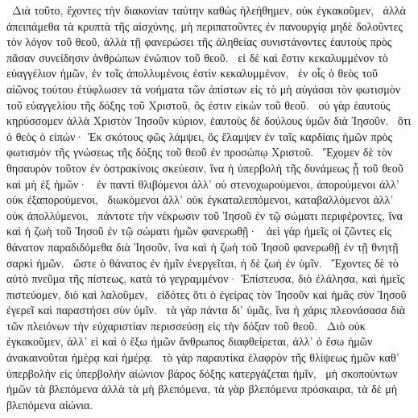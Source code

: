 ~Διὰ τοῦτο, ἔχοντες τὴν διακονίαν ταύτην καθὼς ἠλεήθημεν, οὐκ ἐγκακοῦμεν,
~ἀλλὰ ἀπειπάμεθα τὰ κρυπτὰ τῆς αἰσχύνης, μὴ περιπατοῦντες ἐν πανουργίᾳ μηδὲ δολοῦντες τὸν λόγον τοῦ θεοῦ, ἀλλὰ τῇ φανερώσει τῆς ἀληθείας συνιστάνοντες ἑαυτοὺς πρὸς πᾶσαν συνείδησιν ἀνθρώπων ἐνώπιον τοῦ θεοῦ.
~εἰ δὲ καὶ ἔστιν κεκαλυμμένον τὸ εὐαγγέλιον ἡμῶν, ἐν τοῖς ἀπολλυμένοις ἐστὶν κεκαλυμμένον,
~ἐν οἷς ὁ θεὸς τοῦ αἰῶνος τούτου ἐτύφλωσεν τὰ νοήματα τῶν ἀπίστων εἰς τὸ μὴ αὐγάσαι τὸν φωτισμὸν τοῦ εὐαγγελίου τῆς δόξης τοῦ Χριστοῦ, ὅς ἐστιν εἰκὼν τοῦ θεοῦ.
~οὐ γὰρ ἑαυτοὺς κηρύσσομεν ἀλλὰ Χριστὸν Ἰησοῦν κύριον, ἑαυτοὺς δὲ δούλους ὑμῶν διὰ Ἰησοῦν.
~ὅτι ὁ θεὸς ὁ εἰπών· Ἐκ σκότους φῶς λάμψει, ὃς ἔλαμψεν ἐν ταῖς καρδίαις ἡμῶν πρὸς φωτισμὸν τῆς γνώσεως τῆς δόξης τοῦ θεοῦ ἐν προσώπῳ Χριστοῦ.
~Ἔχομεν δὲ τὸν θησαυρὸν τοῦτον ἐν ὀστρακίνοις σκεύεσιν, ἵνα ἡ ὑπερβολὴ τῆς δυνάμεως ᾖ τοῦ θεοῦ καὶ μὴ ἐξ ἡμῶν·
~ἐν παντὶ θλιβόμενοι ἀλλ’ οὐ στενοχωρούμενοι, ἀπορούμενοι ἀλλ’ οὐκ ἐξαπορούμενοι,
~διωκόμενοι ἀλλ’ οὐκ ἐγκαταλειπόμενοι, καταβαλλόμενοι ἀλλ’ οὐκ ἀπολλύμενοι,
~πάντοτε τὴν νέκρωσιν τοῦ Ἰησοῦ ἐν τῷ σώματι περιφέροντες, ἵνα καὶ ἡ ζωὴ τοῦ Ἰησοῦ ἐν τῷ σώματι ἡμῶν φανερωθῇ·
~ἀεὶ γὰρ ἡμεῖς οἱ ζῶντες εἰς θάνατον παραδιδόμεθα διὰ Ἰησοῦν, ἵνα καὶ ἡ ζωὴ τοῦ Ἰησοῦ φανερωθῇ ἐν τῇ θνητῇ σαρκὶ ἡμῶν.
~ὥστε ὁ θάνατος ἐν ἡμῖν ἐνεργεῖται, ἡ δὲ ζωὴ ἐν ὑμῖν.
~Ἔχοντες δὲ τὸ αὐτὸ πνεῦμα τῆς πίστεως, κατὰ τὸ γεγραμμένον· Ἐπίστευσα, διὸ ἐλάλησα, καὶ ἡμεῖς πιστεύομεν, διὸ καὶ λαλοῦμεν,
~εἰδότες ὅτι ὁ ἐγείρας τὸν Ἰησοῦν καὶ ἡμᾶς σὺν Ἰησοῦ ἐγερεῖ καὶ παραστήσει σὺν ὑμῖν.
~τὰ γὰρ πάντα δι’ ὑμᾶς, ἵνα ἡ χάρις πλεονάσασα διὰ τῶν πλειόνων τὴν εὐχαριστίαν περισσεύσῃ εἰς τὴν δόξαν τοῦ θεοῦ.
~Διὸ οὐκ ἐγκακοῦμεν, ἀλλ’ εἰ καὶ ὁ ἔξω ἡμῶν ἄνθρωπος διαφθείρεται, ἀλλ’ ὁ ἔσω ἡμῶν ἀνακαινοῦται ἡμέρᾳ καὶ ἡμέρᾳ.
~τὸ γὰρ παραυτίκα ἐλαφρὸν τῆς θλίψεως ἡμῶν καθ’ ὑπερβολὴν εἰς ὑπερβολὴν αἰώνιον βάρος δόξης κατεργάζεται ἡμῖν,
~μὴ σκοπούντων ἡμῶν τὰ βλεπόμενα ἀλλὰ τὰ μὴ βλεπόμενα, τὰ γὰρ βλεπόμενα πρόσκαιρα, τὰ δὲ μὴ βλεπόμενα αἰώνια.

